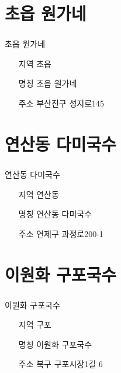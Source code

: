 \documentclass[aspectratio=1610,17pt,xcolor=pdftex,dvipsnames,table,handout]{beamer}
\begin{document}
		\section{ 초읍 원가네	}
		\begin{frame} [t,plain]
		\frametitle{ }
			\begin{block} {초읍 원가네	}
			\setlength{\leftmargini}{4em}			
			\begin{itemize}
				\item [지역] 초읍	
				\item [명칭] 초읍 원가네	
				\item [주소] 부산진구 성지로145
			\end{itemize}
			\end{block}						
		\end{frame}						


		\section{ 연산동 다미국수	}
		\begin{frame} [t,plain]
		\frametitle{ }
			\begin{block} {연산동 다미국수	}
			\setlength{\leftmargini}{4em}			
			\begin{itemize}
				\item [지역] 연산동	
				\item [명칭] 연산동 다미국수	
				\item [주소] 연제구 과정로200-1
			\end{itemize}
			\end{block}						
		\end{frame}						

		\section{ 이원화 구포국수	}
		\begin{frame} [t,plain]
		\frametitle{ }
			\begin{block} {	이원화 구포국수	}
			\setlength{\leftmargini}{4em}			
			\begin{itemize}
				\item [지역] 구포	
				\item [명칭] 이원화 구포국수	
				\item [주소] 북구 구포시장1길 6
			\end{itemize}
			\end{block}						
		\end{frame}						
\end{document}
